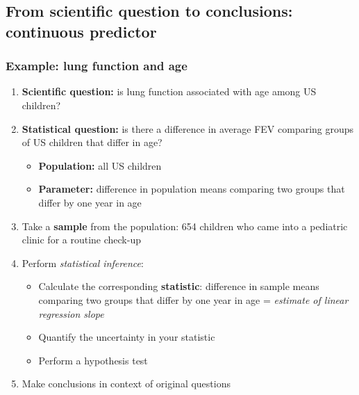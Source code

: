 \documentclass[12pt, 
hyperref={colorlinks=true, linkcolor=blue, urlcolor=cyan}]{beamer}
\begin{document}
\subsection{From scientific question to conclusions: continuous predictor}
\begin{frame}
\frametitle{Example: lung function and age}

\begin{enumerate}
\item \textbf{Scientific question:} is \color{blue} lung function \color{orange} associated \color{black} with age among US children? \pause
\item \textbf{Statistical question:} is there a \color{orange} difference in average \color{blue} FEV \color{black} comparing groups of US children that differ in age? \pause
	\begin{itemize}
	\item \textbf{Population:} all US children
	\item \textbf{Parameter:} difference in population means comparing two groups that differ by one year in age \pause
	\end{itemize}
\item Take a \textbf{sample} from the population: 654 children who came into a pediatric clinic for a routine check-up \pause
\item Perform \textit{statistical inference}:
	\begin{itemize}
	\item Calculate the corresponding \textbf{statistic}: difference in sample means comparing two groups that differ by one year in age \pause = \textit{estimate of linear regression slope} \pause
	\item Quantify the uncertainty in your statistic
	\item Perform a hypothesis test \pause
	\end{itemize}
\item Make conclusions in context of original questions
\end{enumerate}

\end{frame}
\end{document}
